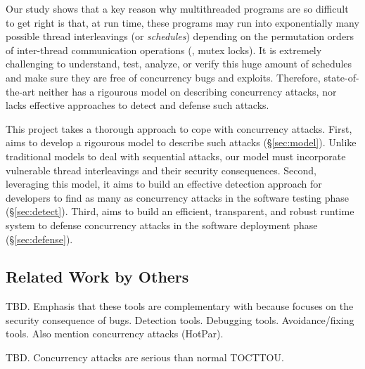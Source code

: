 Our study shows that a key reason why multithreaded programs are so difficult 
to get right is that, at run time, these programs may run into 
exponentially many possible thread interleavings (or \emph{schedules}) 
depending on the permutation orders of inter-thread communication operations 
(\eg, mutex locks). It is extremely challenging to understand, test, analyze, 
or verify this huge amount of schedules and make sure they are free of 
concurrency bugs and exploits. Therefore, state-of-the-art neither has a 
rigourous model on describing concurrency attacks, nor lacks effective 
approaches to detect and defense such attacks.

This \xxx project takes a thorough approach to cope with concurrency attacks.
First, \xxx aims to develop a rigourous model to describe such attacks 
(\S\ref{sec:model}). Unlike traditional models to deal with sequential attacks, 
our model must incorporate vulnerable thread interleavings and their security 
consequences. Second, leveraging this model, it aims to build an effective 
detection approach for developers to find as many as concurrency attacks in the 
software testing phase (\S\ref{sec:detect}). Third, \xxx aims to build an 
efficient, transparent, and robust runtime system to defense concurrency attacks 
in the software deployment phase (\S\ref{sec:defense}).



\subsection{Related Work by Others} \label{sec:others-work}

 TBD. Emphasis that these tools are 
complementary with \xxx because \xxx focuses on the security consequence of 
bugs.
Detection tools.
Debugging tools.
Avoidance/fixing tools.
Also mention concurrency attacks (HotPar).

 TBD. Concurrency attacks are serious than normal 
TOCTTOU.

